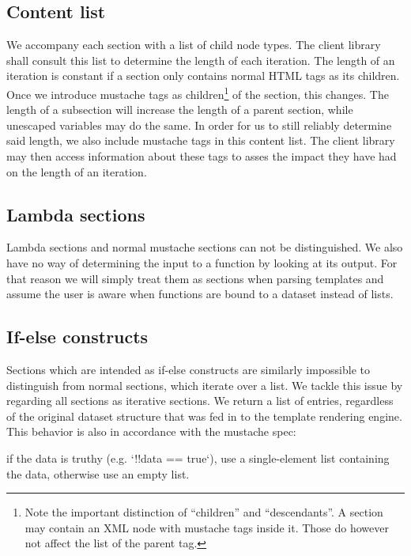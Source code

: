 \documentclass[thesis.tex]{subfiles}
\begin{document}
\subsection{Content list}
\label{sec:content-list}
We accompany each section with a list of child node types. The client library
shall consult this list to determine the length of each iteration.
The length of an iteration is constant if a section only contains normal
HTML tags as its children. Once we introduce mustache tags as children\footnote{
	Note the important distinction of ``children'' and ``descendants''.
	A section may contain an XML node with mustache tags inside it.
	Those do however not affect the  list of the parent tag.
} of the
section, this changes.
The length of a subsection will increase the length of a parent section, while
unescaped variables may do the same.
In order for us to still reliably determine said length, we also include
mustache tags in this content list. The client library may then access
information about these tags to asses the impact they have had on the length of
an iteration.

\subsection{Lambda sections}
Lambda sections and normal mustache sections can not be distinguished.
We also have no way of determining the input to a function by looking at its
output. For that reason we will simply treat them as sections when parsing
templates and assume the user is aware when functions are bound to a dataset
instead of lists.

\subsection{If-else constructs}
\label{sec:if-else}
Sections which are intended as if-else constructs are similarly impossible to
distinguish from normal sections, which iterate over a list. We tackle this
issue by regarding all sections as iterative sections. We return a list of
entries, regardless of the original dataset structure that was fed in to the
template rendering engine.
This behavior is also in accordance with the mustache spec:
\begin{citequote}{\cite[sections.yml]{MSTSPEC}}
	if the data is truthy (e.g. `!!data == true`), use a single-element list
	containing the data, otherwise use an empty list.
\end{citequote}
\end{document}
